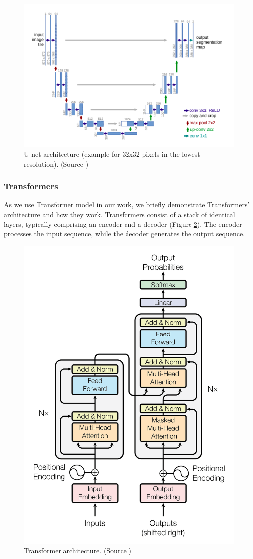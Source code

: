 \begin{figure}
  \centering
  \includegraphics[width=\linewidth]{text/chapter_03/imgs/unet}
  \caption{U-net architecture (example for 32x32 pixels in the lowest resolution). (Source \cite{ronneberger2015unet})}
  \label{fig:unet_architecture}
\end{figure}

\subsubsection{Transformers}
As we use Transformer model in our work, we briefly demonstrate Transformers' architecture and how they work.
Transformers consist of a stack of identical layers, typically comprising an encoder and a decoder (Figure \ref{fig:transformer_architecture}). The
encoder
processes the input sequence, while the decoder generates the output sequence.


\begin{figure}
  \centering
  \includegraphics[width=0.5\linewidth]{text/chapter_03/imgs/transformers}
  \caption{Transformer architecture. (Source \cite{vaswani2023attention})}
  \label{fig:transformer_architecture}
\end{figure}

